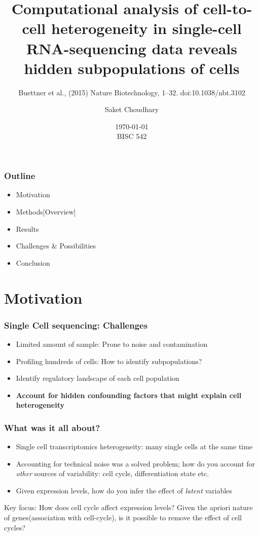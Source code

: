 \documentclass[10pt, compress]{beamer}
\title{Computational analysis of cell-to-cell heterogeneity in single-cell RNA-sequencing data reveals hidden subpopulations of cells}
\subtitle{Buettner et al., (2015) Nature Biotechnology, 1–32. doi:10.1038/nbt.3102}
\author[skc]{Saket Choudhary}
\date{%
\today \\
BISC 542}
\renewcommand{\(}{\begin{columns}}
\renewcommand{\)}{\end{columns}}
\newcommand{\<}[1]{\begin{column}{#1}}
\renewcommand{\>}{\end{column}}
\begin{document}
\maketitle


\begin{frame}[fragile]
\frametitle{Outline}
\begin{itemize}
\item Motivation
\item Methods[Overview]
\item Results
\item Challenges \& Possibilities
\item Conclusion
\end{itemize}
\end{frame}

\section{Motivation}
\begin{frame}[fragile]
\frametitle{Single Cell sequencing: Challenges}
\begin{itemize}[<+- | alert@+>]
\item Limited amount of sample: Prone to noise and contamination
\item Profiling hundreds of cells: How to identify subpopulations?
\item Identify regulatory landscape of each cell population
\item \textbf{Account for hidden confounding factors that might explain cell heterogeneity}
\end{itemize}
\end{frame}

\begin{frame}[fragile]
\frametitle{What was it all about?}
\begin{itemize}
\item Single cell transcriptomics heterogeneity: many single cells at the same time
\item Accounting for technical noise was a solved problem; how do you account for \textit{other} sources of variability: cell cycle,
differentiation state etc.
\item Given expression levels, how do you infer the effect of \textit{latent} variables
\end{itemize}
Key focus: How does cell cycle affect expression levels?
Given the apriori nature of genes(association with cell-cycle), is it possible to remove the effect of cell cycles?

\end{frame}
\end{document}
